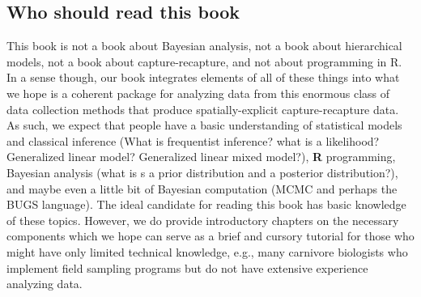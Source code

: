\subsection{Who should read this book}

This book is not a book about Bayesian analysis, not a book about
hierarchical models, not a book about capture-recapture, and not about
programming in R. In a sense though, our book integrates elements of
all of these things into what we hope is a coherent package for
analyzing data from this enormous class of data collection methods
that produce spatially-explicit capture-recapture data.   As such, we
expect that people have a basic understanding of statistical models
and classical inference (What is frequentist inference? what is a
likelihood? Generalized linear model? Generalized linear mixed
model?),
{\bf R} programming,
 Bayesian analysis (what is s a prior distribution and a
posterior distribution?),
and maybe even a little bit
of Bayesian
computation (MCMC and perhaps the BUGS language).
The ideal candidate for reading this book has basic knowledge of these
topics. However, we do provide introductory chapters on the necessary
components which we hope can serve as a brief and cursory tutorial for
those who might have only limited technical knowledge, e.g., many
carnivore biologists who implement field sampling programs but do not
have extensive experience analyzing data.

